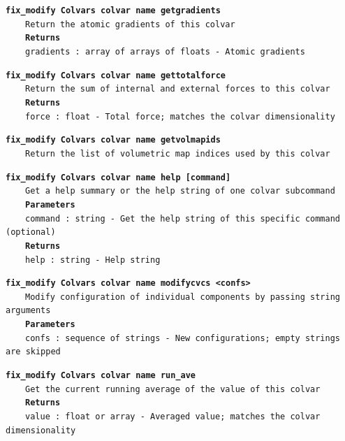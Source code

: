 \begin{mdexampleinput}{}
\texttt{\textbf{fix\_modify Colvars colvar name getgradients}}
\\
\-~~~~\texttt{Return the atomic gradients of this colvar}
\\
\-~~~~\texttt{\textbf{Returns}}
\\
\-~~~~\texttt{gradients : array of arrays of floats - Atomic gradients}
\end{mdexampleinput}
\begin{mdexampleinput}{}
\texttt{\textbf{fix\_modify Colvars colvar name gettotalforce}}
\\
\-~~~~\texttt{Return the sum of internal and external forces to this colvar}
\\
\-~~~~\texttt{\textbf{Returns}}
\\
\-~~~~\texttt{force : float - Total force; matches the colvar dimensionality}
\end{mdexampleinput}
\begin{mdexampleinput}{}
\texttt{\textbf{fix\_modify Colvars colvar name getvolmapids}}
\\
\-~~~~\texttt{Return the list of volumetric map indices used by this colvar}
\end{mdexampleinput}
\begin{mdexampleinput}{}
\texttt{\textbf{fix\_modify Colvars colvar name help [command]}}
\\
\-~~~~\texttt{Get a help summary or the help string of one colvar subcommand}
\\
\-~~~~\texttt{\textbf{Parameters}}
\\
\-~~~~\texttt{command : string - Get the help string of this specific command (optional)}
\\
\-~~~~\texttt{\textbf{Returns}}
\\
\-~~~~\texttt{help : string - Help string}
\end{mdexampleinput}
\begin{mdexampleinput}{}
\texttt{\textbf{fix\_modify Colvars colvar name modifycvcs <confs>}}
\\
\-~~~~\texttt{Modify configuration of individual components by passing string arguments}
\\
\-~~~~\texttt{\textbf{Parameters}}
\\
\-~~~~\texttt{confs : sequence of strings - New configurations; empty strings are skipped}
\end{mdexampleinput}
\begin{mdexampleinput}{}
\texttt{\textbf{fix\_modify Colvars colvar name run\_ave}}
\\
\-~~~~\texttt{Get the current running average of the value of this colvar}
\\
\-~~~~\texttt{\textbf{Returns}}
\\
\-~~~~\texttt{value : float or array - Averaged value; matches the colvar dimensionality}
\end{mdexampleinput}
